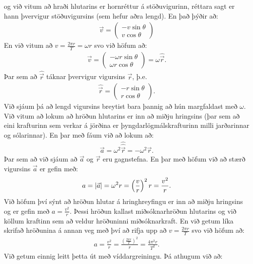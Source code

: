 \ifdefined \wholebook \else\documentclass[oneside]{book}\usepackage{EdlBook}\graphicspath{{figures/}}
\begin{document}
og við vitum að hraði hlutarins er hornréttur á stöðuvigurinn, réttara sagt er hann þvervigur stöðuvigursins (sem hefur aðra lengd). En það þýðir að:
\begin{align*}
    \vec{v} = \begin{pmatrix} -v \sin\theta \\ v \cos\theta \end{pmatrix}
\end{align*}
En við vitum að $v = \frac{2\pi r}{T} = \omega r$ svo við höfum að:
\begin{align*}
    \vec{v} = \begin{pmatrix} -\omega r \sin\theta \\ \omega r \cos\theta \end{pmatrix} = \omega \hat{\vec{r}}.
\end{align*}
Þar sem að $\hat{\vec{r}}$ táknar þvervigur vigursins $\vec{r}$, þ.e.
\begin{align*}
    \hat{\vec{r}} = \begin{pmatrix} -r \sin\theta \\ r \cos\theta \end{pmatrix}.
\end{align*}
Við sjáum þá að lengd vigursins breytist bara þannig að hún margfaldast með $\omega$. Við vitum að lokum að hröðun hlutarins er inn að miðju hringsins (þar sem að eini krafturinn sem verkar á jörðina er þyngdarlögmálskrafturinn milli jarðarinnar og sólarinnar). En þar með fáum við að lokum að:
\begin{align*}
    \vec{a} = \omega^2 \hat{\hat{\vec{r}}} = -\omega^2 \vec{r}.
\end{align*}
Þar sem að við sjáum að $\vec{a}$ og $\vec{r}$ eru gagnstefna. En þar með höfum við að stærð vigursins $\vec{a}$ er gefin með:
\begin{align*}
    a = \abs{\vec{a}} = \omega^2 r = \left(\frac{v}{r}\right)^2 r = \frac{v^2}{r}.
\end{align*}
Við höfum því sýnt að hröðun hlutar á hringhreyfingu er inn að miðju hringsins og er gefin með $a = \frac{v^2}{r}$. Þessi hröðun kallast miðsóknarhröðun hlutarins og við köllum kraftinn sem að veldur hröðuninni miðsóknarkraft. En við getum líka skrifað hröðunina á annan veg með því að rifja upp að $v = \frac{2\pi r}{T}$ svo við höfum að:
\begin{align*}
    a = \frac{v^2}{r} = \frac{\left( \frac{2\pi r}{T} \right)^2}{r} = \frac{4\pi^2 r}{T^2}.
\end{align*}
Við getum einnig leitt þetta út með víddargreiningu. Þá athugum við að:
\end{document}
